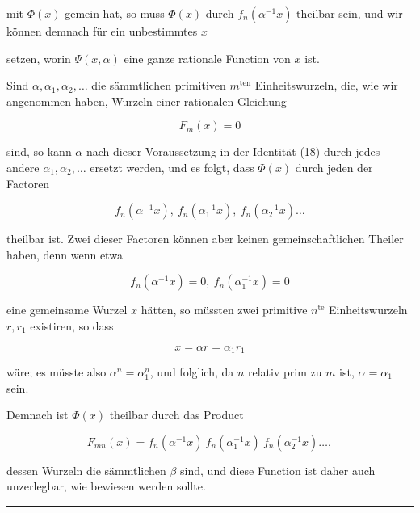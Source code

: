 mit $\Phi(x)$ gemein hat, so muss $\Phi(x)$ durch $f_n(\alpha^{-1}x)$ theilbar sein, und wir können demnach für ein unbestimmtes $x$


setzen, worin $\Psi(x,\alpha)$ eine ganze rationale Function von $x$ ist.

Sind $\alpha, \alpha_1, \alpha_2, \ldots$ die sämmtlichen primitiven $m^{\text{ten}}$ Einheitswurzeln, die, wie wir angenommen haben, Wurzeln einer  rationalen Gleichung

\[
F_m(x) = 0
\]

sind, so kann $\alpha$ nach dieser Voraussetzung in der Identität (18) durch jedes andere $\alpha_1, \alpha_2, \ldots$ ersetzt werden, und es folgt, dass $\Phi(x)$ durch jeden der Factoren

\[
f_n(\alpha^{-1}x),\ f_n(\alpha_1^{-1}x),\ f_n(\alpha_2^{-1}x) \ldots
\]

theilbar ist. Zwei dieser Factoren können aber keinen gemeinschaftlichen Theiler haben, denn wenn etwa

\[
f_n(\alpha^{-1}x) = 0,\ f_n(\alpha_1^{-1}x) = 0
\]

eine gemeinsame Wurzel $x$ hätten, so müssten zwei primitive $n^{\text{te}}$ Einheitswurzeln $r, r_1$ existiren, so dass

\[
x = \alpha r = \alpha_1 r_1
\]

wäre; es müsste also $\alpha^n = \alpha_1^n$, und folglich, da $n$ relativ prim zu $m$ ist, $\alpha = \alpha_1$ sein.

Demnach ist $\Phi(x)$ theilbar durch das Product

\[
F_{mn}(x) = f_n(\alpha^{-1}x)\ f_n(\alpha_1^{-1}x)\ f_n(\alpha_2^{-1}x) \ldots,
\]

dessen Wurzeln die sämmtlichen $\beta$ sind, und diese Function ist daher auch unzerlegbar, wie bewiesen werden sollte.

\begin{center}
\rule{4cm}{0.4pt}
\end{center}
